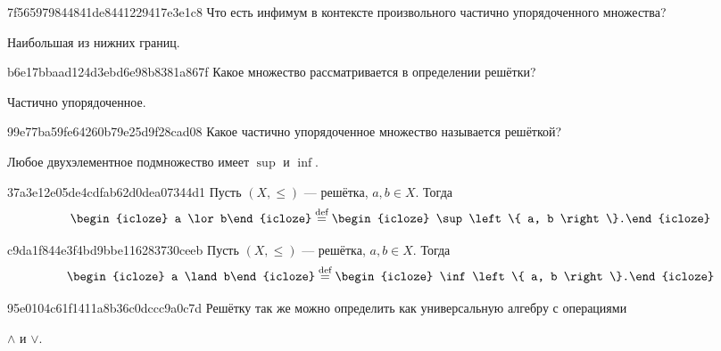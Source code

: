\begin{note}{7f565979844841de8441229417e3e1c8}
    Что есть инфимум в контексте произвольного частично упорядоченного множества?

    \begin{cloze}{1}
        Наибольшая из нижних границ.
    \end{cloze}
\end{note}

\begin{note}{b6e17bbaad124d3ebd6e98b8381a867f}
    Какое множество рассматривается в определении решётки?

    \begin{cloze}{1}
        Частично упорядоченное.
    \end{cloze}
\end{note}

\begin{note}{99e77ba59fe64260b79e25d9f28cad08}
    Какое частично упорядоченное множество называется решёткой?

    \begin{cloze}{1}
        Любое двухэлементное подмножество имеет \({ \sup }\) и \({ \inf }\).
    \end{cloze}
\end{note}

\begin{note}{37a3e12e05de4cdfab62d0dea07344d1}
    Пусть \({ (X, \leqslant) }\) --- решётка, \({ a, b \in X }\).
    Тогда
    \[
        \begin{icloze}{2}a \lor b\end{icloze} \overset{\text{def}}= \begin{icloze}{1}\sup \left\{ a, b \right\}.\end{icloze}
    \]
\end{note}

\begin{note}{c9da1f844e3f4bd9bbe116283730ceeb}
    Пусть \({ (X, \leqslant) }\) --- решётка, \({ a, b \in X }\).
    Тогда
    \[
        \begin{icloze}{2}a \land b\end{icloze} \overset{\text{def}}= \begin{icloze}{1}\inf \left\{ a, b \right\}.\end{icloze}
    \]
\end{note}

\begin{note}{95e0104c61f1411a8b36c0dccc9a0c7d}
    Решётку так же можно определить как универсальную алгебру с операциями \begin{icloze}{1}\({ \land }\) и \({ \lor }\).\end{icloze}
\end{note}

